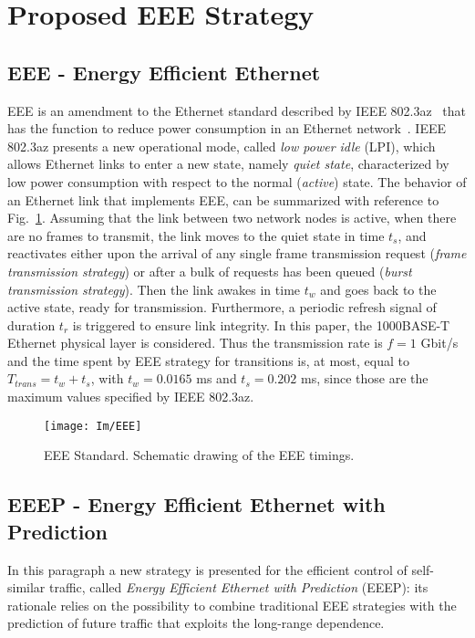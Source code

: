 \documentclass[journal,10pt,twoside,final]{IEEEtran}
\begin{document}
\section{Proposed EEE Strategy}
\label{sec:selfSimilarTrafficShaping}
\subsection{EEE - Energy Efficient Ethernet}

EEE is an amendment to the Ethernet standard described by IEEE 802.3az~\cite{eee} that has the function to reduce power consumption in an Ethernet network~\cite{ChristensenReviriegoNordman10}. 
IEEE 802.3az presents a new operational mode, called \textit{low power idle} (LPI), which allows Ethernet links to enter a new state, namely \emph{quiet state}, characterized by low power consumption with respect to the normal (\emph{active}) state. 
The behavior of an Ethernet link that implements EEE, can be summarized with reference to Fig.~\ref{fig:EEE}.
Assuming that the link between two network nodes is active, when there are no frames to transmit, the link moves to the quiet state in time $t_s$, and reactivates either upon the arrival of any single frame transmission request (\emph{frame transmission strategy}) or after a bulk of requests has been queued (\emph{burst transmission strategy}).
Then the link awakes in time $t_w$ and goes back to the active state, ready for transmission. Furthermore, a periodic refresh signal of duration $t_r$ is triggered to ensure link integrity. 
In this paper, the 1000BASE-T Ethernet physical layer is considered. Thus the transmission rate is $f=1$ Gbit/s and the time spent by EEE strategy for transitions is, at most, equal to $T_{trans} = t_w + t_s$, with $t_w = 0.0165$ ms and $t_s = 0.202$ ms, since those are the maximum values specified by IEEE 802.3az.

\begin{figure}[h]
\centering
\texttt{[image: Im/EEE]}
\caption{EEE Standard. Schematic drawing of the EEE timings.}
\label{fig:EEE}
\end{figure}

\subsection{EEEP - Energy Efficient Ethernet with Prediction}
\label{subsec:EEEP}

In this paragraph a new strategy is presented for the efficient control of self-similar traffic, called \emph{Energy Efficient Ethernet with Prediction} (EEEP): its rationale relies on the possibility to combine traditional EEE strategies with the prediction of future traffic that exploits the long-range dependence.
\end{document}
